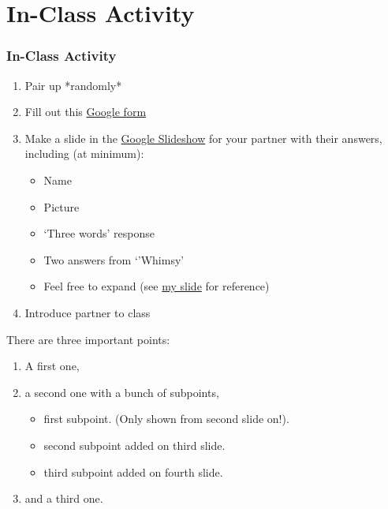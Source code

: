 \documentclass{beamer}
\begin{document}
\section{In-Class Activity}

\begin{frame}
\frametitle{In-Class Activity}
	\begin{enumerate}
	\item Pair up *randomly*
	\item Fill out this \href{https://goo.gl/forms/fnCaNIcwQiNiawcv1}{Google form}
	\item Make a slide in the \href{https://docs.google.com/presentation/d/1WxVQJGrBO8NxQ2ZJwvZy2W61qAQYqN9V8a_xRUflU7w/edit?usp=sharing}{Google Slideshow} for your partner with their answers, including (at minimum):
		\begin{itemize}
		\item Name
		\item Picture
		\item `Three words' response
		\item Two answers from `'Whimsy'
		\item Feel free to expand (see \href{https://docs.google.com/presentation/d/1WxVQJGrBO8NxQ2ZJwvZy2W61qAQYqN9V8a_xRUflU7w/edit?usp=sharing}{my slide} for reference)
		\end{itemize}
	\item Introduce partner to class
	\end{enumerate}
\end{frame}

\begin{frame}
  There are three important points:
  \begin{enumerate}
  \item<1-> A first one,
  \item<2-> a second one with a bunch of subpoints,
    \begin{itemize}
    \item first subpoint. (Only shown from second slide on!).
    \item<3-> second subpoint added on third slide.
    \item<4-> third subpoint added on fourth slide.
    \end{itemize}
  \item<5-> and a third one.
  \end{enumerate}
\end{frame}
\end{document}
